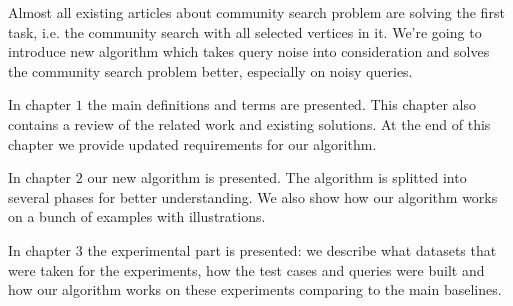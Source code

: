 Almost all existing articles about community search problem are solving the first task, i.e. the community search with all selected vertices in it. We're going to introduce new algorithm which takes query noise into consideration and solves the community search problem better, especially on noisy queries.

In chapter $1$ the main definitions and terms are presented. This chapter also contains a review of the related work and existing solutions. At the end of this chapter we provide updated requirements for our algorithm.

In chapter $2$ our new algorithm is presented. The algorithm is splitted into several phases for better understanding. We also show how our algorithm works on a bunch of examples with illustrations.

In chapter $3$ the experimental part is presented: we describe what datasets that were taken for the experiments, how the test cases and queries were built and how our algorithm works on these experiments comparing to the main baselines.
